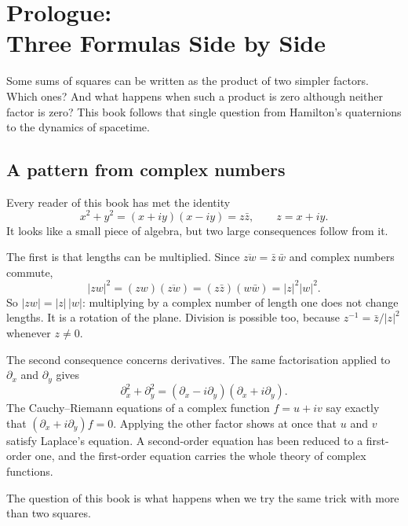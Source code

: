 \chapter[Prologue: Three Formulas Side by Side]{Prologue:\\ Three Formulas Side by Side}
\label{ch:prologue}

\begin{question}
Some sums of squares can be written as the product of two simpler factors. Which ones? And what happens when such a product is zero although neither factor is zero? This book follows that single question from Hamilton's quaternions to the dynamics of spacetime.
\end{question}

\section{A pattern from complex numbers}

Every reader of this book has met the identity
\begin{equation}\label{eq:pro-complex}
  x^2+y^2=(x+iy)(x-iy)=z\bar z ,\qquad z=x+iy .
\end{equation}
It looks like a small piece of algebra, but two large consequences follow from it.

The first is that lengths can be multiplied. Since $\overline{zw}=\bar z\,\bar w$ and complex numbers commute,
\[
  |zw|^2=(zw)(\overline{zw})=(z\bar z)(w\bar w)=|z|^2|w|^2 .
\]
So $|zw|=|z|\,|w|$: multiplying by a complex number of length one does not change lengths. It is a rotation of the plane. Division is possible too, because $z^{-1}=\bar z/|z|^2$ whenever $z\neq0$.

The second consequence concerns derivatives. The same factorisation applied to $\partial_x$ and $\partial_y$ gives
\begin{equation}\label{eq:pro-laplace2}
  \partial_x^2+\partial_y^2=(\partial_x-i\partial_y)(\partial_x+i\partial_y).
\end{equation}
The Cauchy--Riemann equations of a complex function $f=u+iv$ say exactly that $(\partial_x+i\partial_y)f=0$. Applying the other factor shows at once that $u$ and $v$ satisfy Laplace's equation. A second-order equation has been reduced to a first-order one, and the first-order equation carries the whole theory of complex functions.

The question of this book is what happens when we try the same trick with more than two squares.

